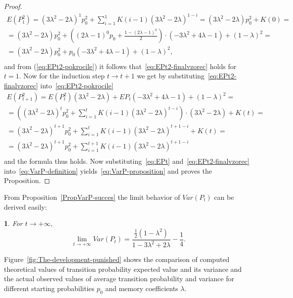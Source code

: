 \documentclass{amsart}
\theoremstyle{definition}
\theoremstyle{plain}
\theoremstyle{plain}
\newtheorem{cor}[thm]{\protect\corollaryname}
\theoremstyle{plain}
\numberwithin{equation}{section}
\providecommand{\corollaryname}{Corollary}
\begin{document}
\begin{proof}
\begin{gather*}
            E(P_{1}^{2})=(3\lambda^{2}-2\lambda)^{1}p_{0}^{2}+\sum_{i=1}^{1}K(i-1)(3\lambda^{2}-2\lambda)^{1-i}=(3\lambda^{2}-2\lambda)p_{0}^{2}+K(0)=\\
            =(3\lambda^{2}-2\lambda)p_{0}^{2}+((2\lambda-1)^{0}p_{0}+\frac{1-(2\lambda-1)^{0}}{2})\cdot(-3\lambda^{2}+4\lambda-1)+(1-\lambda)^{2}=\\
            =(3\lambda^{2}-2\lambda)p_{0}^{2}+p_{0}(-3\lambda^{2}+4\lambda-1)+(1-\lambda)^{2},\\
        \end{gather*}
        and from (\ref{eq:EPt2-pokrocile}) it follows that~\eqref{eq:EPt2-finalvzorec}
        holds for $t=1$.
        Now for the induction step $t\rightarrow t+1$ we get by substituting~\eqref{eq:EPt2-finalvzorec} into~\eqref{eq:EPt2-pokrocile}
        \begin{gather*}
            E(P_{t+1}^{2})=E(P_{t}^{2})(3\lambda^{2}-2\lambda)+EP_{t}(-3\lambda^{2}+4\lambda-1)+(1-\lambda)^{2}=\\
            =((3\lambda^{2}-2\lambda)^{t}p_{0}^{2}+\sum_{i=1}^{t}K(i-1)(3\lambda^{2}-2\lambda)^{t-i})\cdot(3\lambda^{2}-2\lambda)+K(t)=\\
            =(3\lambda^{2}-2\lambda)^{t+1}p_{0}^{2}+\sum_{i=1}^{t}K(i-1)(3\lambda^{2}-2\lambda)^{t+1-i}+K(t)=\\
            =(3\lambda^{2}-2\lambda)^{t+1}p_{0}^{2}+\sum_{i=1}^{t+1}K(i-1)(3\lambda^{2}-2\lambda)^{t+1-i}\\
        \end{gather*}
        and the formula thus holds.
        Now substituting~\eqref{eq:EPt} and~\eqref{eq:EPt2-finalvzorec}
        into~\eqref{eq:VarP-definition} yields~\eqref{eq:VarP-proposition}
        and proves the Proposition.
    \end{proof}
    From Proposition~\ref{PropVarP-succes} the limit behavior of $Var(P_{t})$
    can be derived easily:

    \begin{cor}
        For $t\rightarrow+\infty,$ \textup{
            \begin{equation}
                \lim_{t\to+\infty}Var(P_{t})=\frac{\frac{1}{2}(1-\lambda^{2})}{1-3\lambda^{2}+2\lambda}-\frac{1}{4}.\label{eq:CoroVarpt-statement}
            \end{equation}
        }
    \end{cor}

    Figure~\ref{fig:The-development-punished} shows the comparison of
    computed theoretical values of transition probability expected value and its variance and the actual observed values of average transition
    probability and variance for different starting probabilities $p_{0}$
    and memory coefficients $\lambda$.
\end{document}
